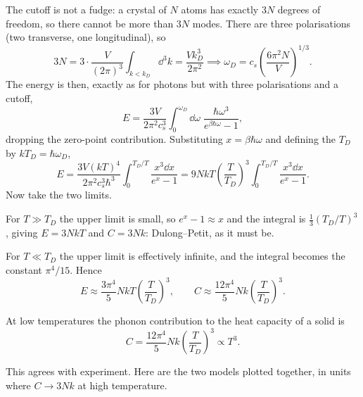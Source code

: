 The cutoff is not a fudge: a crystal of $N$ atoms has exactly $3N$ degrees of freedom, so there cannot be more than $3N$ modes. There are three polarisations (two transverse, one longitudinal), so
$$
3N = 3\cdot \frac{V}{(2\pi)^3}\int_{k < k_D}\dd^3 k = \frac{V k_D^3}{2\pi^2} \implies \omega_D = c_s\left(\frac{6\pi^2 N}{V}\right)^{1/3}.
$$
The energy is then, exactly as for photons but with three polarisations and a cutoff,
$$
E = \frac{3V}{2\pi^2c_s^3}\int_0^{\omega_D} \dd\omega\; \frac{\hbar\omega^3}{e^{\beta\hbar\omega}-1},
$$
dropping the zero-point contribution. Substituting $x = \beta\hbar\omega$ and defining the  $T_D$ by $kT_D = \hbar\omega_D$,
$$
E = \frac{3V (kT)^4}{2\pi^2 c_s^3\hbar^3}\int_0^{T_D/T}\frac{x^3\dd x}{e^x - 1} = 9NkT\left(\frac{T}{T_D}\right)^3\int_0^{T_D/T}\frac{x^3\dd x}{e^x-1}.
$$
Now take the two limits.

For $T \gg T_D$ the upper limit is small, so $e^x - 1 \approx x$ and the integral is $\tfrac 13 (T_D/T)^3$, giving $E = 3NkT$ and $C = 3Nk$: Dulong--Petit, as it must be.

For $T \ll T_D$ the upper limit is effectively infinite, and the integral becomes the constant $\pi^4/15$. Hence
$$
E \approx \frac{3\pi^4}{5}NkT\left(\frac{T}{T_D}\right)^3, \qquad C \approx \frac{12\pi^4}{5}Nk\left(\frac{T}{T_D}\right)^3.
$$

\begin{proposition}
	At low temperatures the phonon contribution to the heat capacity of a solid is
	$$
	C = \frac{12\pi^4}{5}Nk\left(\frac{T}{T_D}\right)^3 \propto T^3.
	$$
\end{proposition}

This agrees with experiment. Here are the two models plotted together, in units where $C \to 3Nk$ at high temperature.

